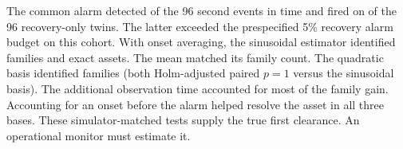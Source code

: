 The common alarm detected \ModalTriggerCount{} of the 96 second events
in time and fired on \ModalConfirmNull{} of the 96 recovery-only twins.
The latter exceeded the prespecified 5\% recovery alarm budget on this
cohort. With onset averaging, the sinusoidal estimator identified
\ModalConfirmFamily{} families and \ModalConfirmSite{} exact assets.
The mean matched its family count. The quadratic basis identified
\ModalConfirmQuad{} families (both Holm-adjusted paired $p=1$ versus
the sinusoidal basis). The additional observation time accounted for
most of the family gain. Accounting for an onset before the alarm
helped resolve the asset in all three bases. These simulator-matched
tests supply the true first clearance. An operational monitor must
estimate it.
